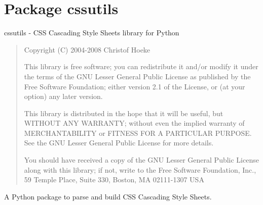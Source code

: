 %
%
%


\section{Package cssutils}

    \label{cssutils}

cssutils - CSS Cascading Style Sheets library for Python
\begin{quote}

Copyright (C) 2004-2008 Christof Hoeke

This library is free software; you can redistribute it and/or
modify it under the terms of the GNU Lesser General Public
License as published by the Free Software Foundation; either
version 2.1 of the License, or (at your option) any later version.

This library is distributed in the hope that it will be useful,
but WITHOUT ANY WARRANTY; without even the implied warranty of
MERCHANTABILITY or FITNESS FOR A PARTICULAR PURPOSE.  See the GNU
Lesser General Public License for more details.

You should have received a copy of the GNU Lesser General Public
License along with this library; if not, write to the Free Software
Foundation, Inc., 59 Temple Place, Suite 330, Boston, MA 02111-1307 USA
\end{quote}

A Python package to parse and build CSS Cascading Style Sheets.

